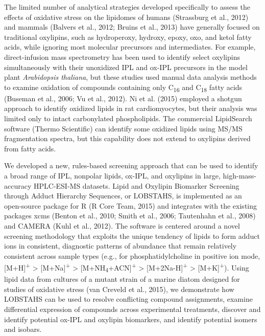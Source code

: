The limited number of analytical strategies developed specifically to assess the effects of oxidative stress on the lipidomes of humans (Strassburg et al., 2012) and mammals (Balvers et al., 2012; Bruins et al., 2013) have generally focused on traditional oxylipins, such as hydroperoxy, hydroxy, epoxy, oxo, and ketol fatty acids, while ignoring most molecular precursors and intermediates. For example, direct-infusion mass spectrometry has been used to identify select oxylipins simultaneously with their unoxidized IPL and ox-IPL precursors in the model plant \emph{Arabidopsis thaliana}, but these studies used manual data analysis methods to examine oxidation of compounds containing only C\textsubscript{16} and C\textsubscript{18} fatty acids (Buseman et al., 2006; Vu et al., 2012). Ni et al. (2015) employed a shotgun approach to identify oxidized lipids in rat cardiomyocytes, but their analysis was limited only to intact carbonylated phospholipids. The commercial LipidSearch software (Thermo Scientific) can identify some oxidized lipids using MS/MS fragmentation spectra, but this capability does not extend to oxylipins derived from fatty acids.

We developed a new, rules-based screening approach that can be used to identify a broad range of IPL, nonpolar lipids, ox-IPL, and oxylipins in large, high-mass-accuracy HPLC-ESI-MS datasets. Lipid and Oxylipin Biomarker Screening through Adduct Hierarchy Sequences, or LOBSTAHS, is implemented as an open-source package for R (R Core Team, 2015) and integrates with the existing packages xcms (Benton et al., 2010; Smith et al., 2006; Tautenhahn et al., 2008) and CAMERA (Kuhl et al., 2012). The software is centered around a novel screening methodology that exploits the unique tendency of lipids to form adduct ions in consistent, diagnostic patterns of abundance that remain relatively consistent across sample types (e.g., for phosphatidylcholine in positive ion mode, {[}M+H{]}\textsuperscript{+} \textgreater{} {[}M+Na{]}\textsuperscript{+} \textgreater{} {[}M+NH\textsubscript{4}+ACN{]}\textsuperscript{+} \textgreater{} {[}M+2Na-H{]}\textsuperscript{+} \textgreater{} {[}M+K{]}\textsuperscript{+}). Using lipid data from cultures of a mutant strain of a marine diatom designed for studies of oxidative stress (van Creveld et al., 2015), we demonstrate how LOBSTAHS can be used to resolve conflicting compound assignments, examine differential expression of compounds across experimental treatments, discover and identify potential ox-IPL and oxylipin biomarkers, and identify potential isomers and isobars.

